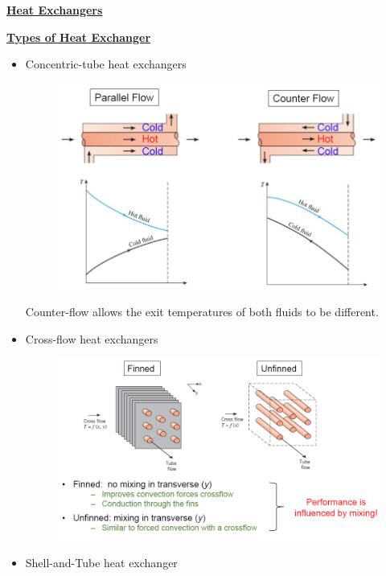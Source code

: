 \underline{\Large \textbf{Heat Exchangers}}

\vspace{0.5cm}
\underline{ \textbf{Types of Heat Exchanger}}
\begin{itemize}
    \item Concentric-tube heat exchangers
    \begin{figure}[H]
        \centering
        \includegraphics[width=1.0\linewidth]{images/concentric_tube_heat_exchangers.png}
    \end{figure}
    Counter-flow allows the exit temperatures of both fluids to be different.
    \item Cross-flow heat exchangers
    \begin{figure}[H]
        \centering
        \includegraphics[width=1.0\linewidth]{images/cross_flow_heat_exchanger.png}
    \end{figure}
    \item Shell-and-Tube heat exchanger
    \begin{figure}[H]
        \centering

\end{figure}
\end{itemize}
